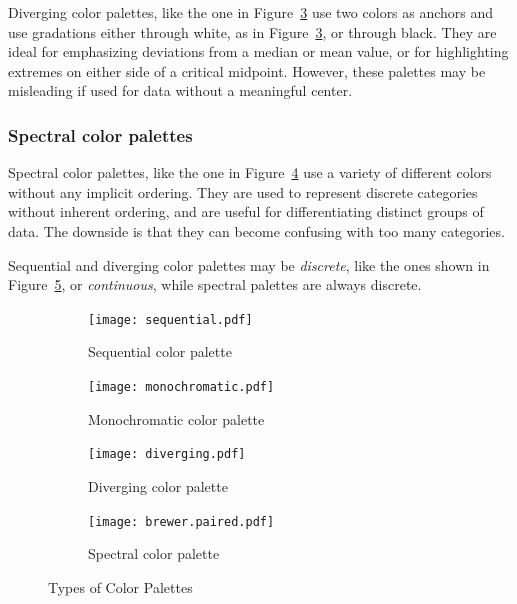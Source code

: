 Diverging color palettes, like the one in Figure~\ref{fig:diverging} use two colors as anchors and use gradations either through white, as in Figure~\ref{fig:diverging}, or through black. They are ideal for emphasizing deviations from a median or mean value, or for highlighting extremes on either side of a critical midpoint. However, these palettes may be misleading if used for data without a meaningful center.

\subsubsection*{Spectral color palettes}

Spectral color palettes, like the one in Figure~\ref{fig:spectral} use a variety of different colors without any implicit ordering. They are used to represent discrete categories without inherent ordering, and are useful for differentiating distinct groups of data. The downside is that they can become confusing with too many categories. 

Sequential and diverging color palettes may be \emph{discrete}, like the ones shown in Figure~\ref{fig:palettes}, or \emph{continuous}, while spectral palettes are always discrete.

\begin{figure}
\begin{subfigure}{\textwidth}
\centering
\texttt{[image: sequential.pdf]}
\caption{Sequential color palette} 
\label{fig:sequential}
\end{subfigure}

\begin{subfigure}{\textwidth}
\centering
\texttt{[image: monochromatic.pdf]}
\caption{Monochromatic color palette} 
\label{fig:monchromatic}
\end{subfigure}

\begin{subfigure}{\textwidth}
\centering
\texttt{[image: diverging.pdf]}
\caption{Diverging color palette} 
\label{fig:diverging}
\end{subfigure}

\begin{subfigure}{\textwidth}
\centering
\texttt{[image: brewer.paired.pdf]}
\caption{Spectral color palette} 
\label{fig:spectral}
\end{subfigure}

\caption{Types of Color Palettes}
\label{fig:palettes}
\end{figure}

